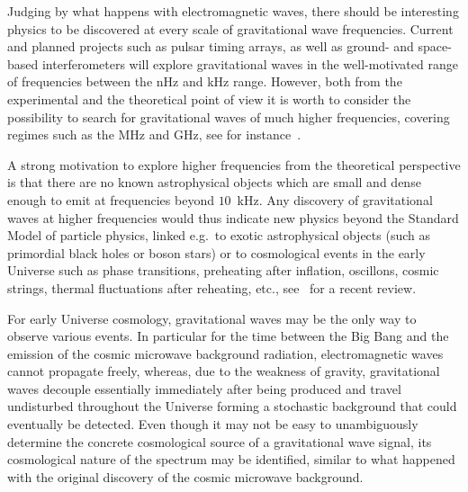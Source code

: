 \documentclass[11pt,a4paper]{article}
\begin{document}
Judging by what happens with electromagnetic waves, there should be interesting physics to be discovered at every scale of gravitational wave frequencies. Current and planned projects such as pulsar timing arrays, as well as ground- and space-based interferometers will explore gravitational waves in the well-motivated range of frequencies between the nHz and kHz range. However, both from the experimental and the theoretical point of view it is worth to consider the possibility to search for gravitational waves of much higher frequencies, covering regimes such as the MHz and GHz, see for instance~\cite{Cruise:2012zz}.

A strong motivation to explore higher frequencies from the theoretical perspective is that there are no known astrophysical objects which are small and dense enough to emit at frequencies beyond $10 \,$ kHz. Any discovery of gravitational waves at higher frequencies would thus indicate new physics beyond the Standard Model of particle physics, linked e.g.\ to exotic astrophysical objects (such as primordial black holes or boson stars) or to cosmological events in the early Universe such as phase transitions, preheating after inflation, oscillons, cosmic strings, thermal fluctuations after reheating, etc., see~\cite{Caprini:2018mtu} for a recent review.

For early Universe cosmology, gravitational waves may be the only way to observe various events. In particular for the time between the Big Bang and the emission of the cosmic microwave background radiation, electromagnetic waves cannot propagate freely, whereas, due to the weakness of gravity, gravitational waves decouple essentially immediately after being produced and travel undisturbed throughout the Universe forming a stochastic background that could eventually be detected. Even though it may not be easy to unambiguously determine the concrete cosmological source of a gravitational wave signal, its cosmological nature of the spectrum may be identified, similar to what happened with the original discovery of the cosmic microwave background.
\end{document}
